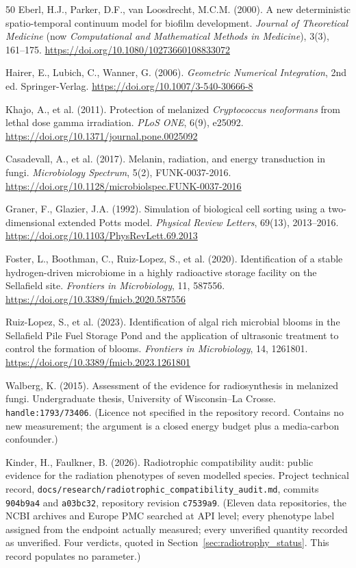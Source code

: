 \documentclass[11pt]{article}
\begin{document}
\begin{thebibliography}{50}
Eberl, H.J., Parker, D.F., van Loosdrecht, M.C.M. (2000).
A new deterministic spatio-temporal continuum model for biofilm development.
\textit{Journal of Theoretical Medicine} (now \textit{Computational and Mathematical
Methods in Medicine}), 3(3), 161--175.
\url{https://doi.org/10.1080/10273660108833072}

Hairer, E., Lubich, C., Wanner, G. (2006).
\textit{Geometric Numerical Integration}, 2nd ed.
Springer-Verlag.
\url{https://doi.org/10.1007/3-540-30666-8}

Khajo, A., et al. (2011).
Protection of melanized \textit{Cryptococcus neoformans} from lethal dose gamma irradiation.
\textit{PLoS ONE}, 6(9), e25092.
\url{https://doi.org/10.1371/journal.pone.0025092}

Casadevall, A., et al. (2017).
Melanin, radiation, and energy transduction in fungi.
\textit{Microbiology Spectrum}, 5(2), FUNK-0037-2016.
\url{https://doi.org/10.1128/microbiolspec.FUNK-0037-2016}

Graner, F., Glazier, J.A. (1992).
Simulation of biological cell sorting using a two-dimensional extended Potts model.
\textit{Physical Review Letters}, 69(13), 2013--2016.
\url{https://doi.org/10.1103/PhysRevLett.69.2013}

Foster, L., Boothman, C., Ruiz-Lopez, S., et al. (2020).
Identification of a stable hydrogen-driven microbiome in a highly radioactive storage facility on
the Sellafield site. \textit{Frontiers in Microbiology}, 11, 587556.
\url{https://doi.org/10.3389/fmicb.2020.587556}

Ruiz-Lopez, S., et al. (2023).
Identification of algal rich microbial blooms in the Sellafield Pile Fuel Storage Pond and the
application of ultrasonic treatment to control the formation of blooms.
\textit{Frontiers in Microbiology}, 14, 1261801.
\url{https://doi.org/10.3389/fmicb.2023.1261801}

Walberg, K. (2015).
Assessment of the evidence for radiosynthesis in melanized fungi.
Undergraduate thesis, University of Wisconsin--La Crosse. \texttt{handle:1793/73406}.
(Licence not specified in the repository record. Contains no new measurement; the argument is a
closed energy budget plus a media-carbon confounder.)

Kinder, H., Faulkner, B. (2026).
Radiotrophic compatibility audit: public evidence for the radiation phenotypes of seven modelled
species. Project technical record, \texttt{docs/research/radiotrophic\_compatibility\_audit.md},
commits \texttt{904b9a4} and \texttt{a03bc32}, repository revision \texttt{c7539a9}.
(Eleven data repositories, the NCBI archives and Europe PMC searched at API level; every phenotype
label assigned from the endpoint actually measured; every unverified quantity recorded as
unverified. Four verdicts, quoted in Section~\ref{sec:radiotrophy_status}. This record populates no
parameter.)


\end{thebibliography}
\end{document}

